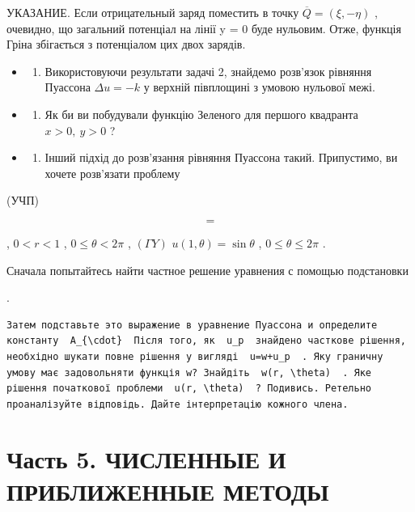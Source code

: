 \documentclass[
  ukrainian,
]{article}
\providecommand{\tightlist}{%
  \setlength{\itemsep}{0pt}\setlength{\parskip}{0pt}}
\begin{document}
УКАЗАНИЕ. Если отрицательный заряд поместить в точку
\(\overline{Q} = (\xi, -\eta)\) , очевидно, що загальний потенціал на
лінії y = 0 буде нульовим. Отже, функція Гріна збігається з потенціалом
цих двох зарядів.

\begin{itemize}
\tightlist
\item
  \begin{enumerate}
  \def\labelenumi{\arabic{enumi}.}
  \setcounter{enumi}{2}
  \tightlist
  \item
    Використовуючи результати задачі 2, знайдемо розв'язок рівняння
    Пуассона \(\Delta u = -k\) у верхній півплощині з умовою нульової
    межі.
  \end{enumerate}
\item
  \begin{enumerate}
  \def\labelenumi{\arabic{enumi}.}
  \setcounter{enumi}{3}
  \tightlist
  \item
    Як би ви побудували функцію Зеленого для першого квадранта
    \(x>0,\ y>0\) ?
  \end{enumerate}
\item
  \begin{enumerate}
  \def\labelenumi{\arabic{enumi}.}
  \setcounter{enumi}{4}
  \tightlist
  \item
    Інший підхід до розв'язання рівняння Пуассона такий. Припустимо, ви
    хочете розв'язати проблему
  \end{enumerate}
\end{itemize}

(УЧП)

\[
=
\]

, \(0 < r < 1\) , \(0 \le \theta < 2\pi\) , \((\Gamma Y)\)
\(u(1, \theta) = \sin \theta\) , \(0 \le \theta \le 2\pi\) .

Сначала попытайтесь найти частное решение уравнения с помощью
подстановки

.

\begin{verbatim}
Затем подставьте это выражение в уравнение Пуассона и определите константу  A_{\cdot}  Після того, як  u_p  знайдено часткове рішення, необхідно шукати повне рішення у вигляді  u=w+u_p  . Яку граничну умову має задовольняти функція w? Знайдіть  w(r, \theta)  . Яке рішення початкової проблеми  u(r, \theta)  ? Подивись. Ретельно проаналізуйте відповідь. Дайте інтерпретацію кожного члена.
\end{verbatim}

\section{Часть 5. ЧИСЛЕННЫЕ И ПРИБЛИЖЕННЫЕ
МЕТОДЫ}\label{ux447ux430ux441ux442ux44c-5.-ux447ux438ux441ux43bux435ux43dux43dux44bux435-ux438-ux43fux440ux438ux431ux43bux438ux436ux435ux43dux43dux44bux435-ux43cux435ux442ux43eux434ux44b}
\end{document}
